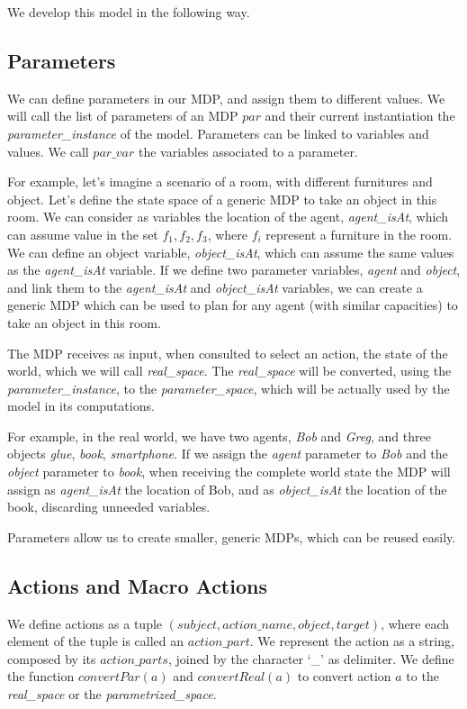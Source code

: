  We develop this model in the following way.

\subsection{Parameters}
We can define parameters in our MDP, and assign them to different values. We will call the list of parameters of an MDP $par$ and their current instantiation the \textit{parameter\_instance} of the model. Parameters can be linked to variables and values. We call $par\_var$ the variables associated to a parameter. 

For example, let's imagine a scenario of a room, with different furnitures and object. Let's define the state space of a generic MDP to take an object in this room. We can consider as variables the location of the agent, \textit{agent\_isAt}, which can assume value in the set ${f_1, f_2, f_3}$, where $f_i$ represent a furniture in the room. We can define an object variable, \textit{object\_isAt}, which can assume the same values as the \textit{agent\_isAt} variable. If we define two parameter variables, \textit{agent} and \textit{object}, and link them to the \textit{agent\_isAt} and \textit{object\_isAt} variables, we can create a generic MDP which can be used to plan for any agent (with similar capacities) to take an object in this room.

The MDP receives as input, when consulted to select an action, the state of the world,  which we will call \textit{real\_space}. The \textit{real\_space} will be converted, using the \textit{parameter\_instance}, to the \textit{parameter\_space}, which will be actually used by the model in its computations. 

For example, in the real world, we have two agents, \textit{Bob} and \textit{Greg}, and three objects \textit{glue}, \textit{book}, \textit{smartphone}. If we assign the \textit{agent} parameter to \textit{Bob} and the \textit{object} parameter to \textit{book}, when receiving the complete world state the MDP will assign as \textit{agent\_isAt} the location of Bob, and as \textit{object\_isAt} the location of the book, discarding unneeded variables.

Parameters allow us to create smaller, generic MDPs, which can be reused easily.


\subsection{Actions and Macro Actions}
We define actions as a tuple $(subject,action\_name,object,target)$, where each element of the tuple is called an $action\_part$.  We represent the action as a string, composed by its $action\_parts$, joined by the character `\_' as delimiter. We define the function $convertPar(a)$ and $convertReal(a)$ to convert action $a$ to the \textit{real\_space} or the \textit{parametrized\_space}.

